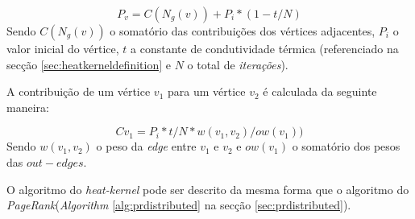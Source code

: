 \documentclass[a4paper,10pt]{report}
\begin{document}
  \begin{center}
    \begin{equation}
      \label{eq:heatkerneldistributedrank}
       P_v =  C(N_g(v)) + P_i * (1 - t/N)
    \end{equation}
    Sendo $C(N_g(v))$ o somatório das contribuições dos vértices adjacentes, $P_i$  o valor inicial do vértice, $t$ a constante de condutividade térmica (referenciado na secção \ref{sec:heatkerneldefinition} e $N$ o total de \textit{iterações}).
  \end{center}    
  
  A contribuição de um vértice $v_1$ para um vértice $v_2$ é calculada da seguinte maneira:
  
  \begin{center}
    \begin{equation}
      \label{eq:heatkerneldistributedcontribution}
       Cv_1=P_i * t / N * w(v_1,v_2)/ow(v_1))
    \end{equation}
    Sendo $w(v_1,v_2)$ o peso da \textit{edge} entre $v_1$ e $v_2$ e $ow(v_1)$ o somatório dos pesos das $out-edges$.
  \end{center}  
  
  O algoritmo do \textit{heat-kernel} pode ser descrito da mesma forma que o algoritmo do \textit{PageRank}(\textit{Algorithm} \ref{alg:prdistributed} na secção \ref{sec:prdistributed}).
  
\end{document}
